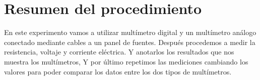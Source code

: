 \documentclass[letterpaper, 12pt]{report}
\begin{document}
\section{Resumen del procedimiento}

En este experimento vamos a utilizar multímetro digital y un multímetro 
análogo conectado mediante cables a un panel de fuentes. Después procedemos 
a medir la resistencia, voltaje y corriente eléctrica. Y anotarlos los 
resultados que nos muestra los multímetros, Y por último repetimos las 
mediciones  cambiando los valores para poder comparar los datos entre los 
dos tipos de multímetros.

\newpage

\end{document}
